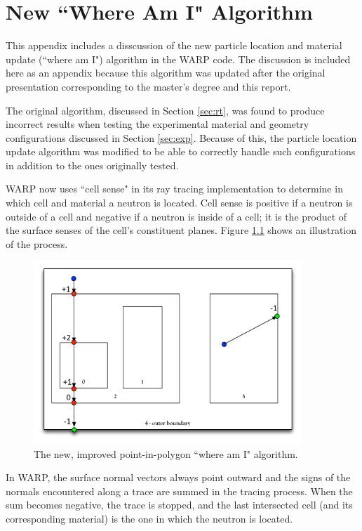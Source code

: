 \chapter{New ``Where Am I" Algorithm}
\label{app:A}

This appendix includes a disscussion of the new particle location and material update (``where am I")
algorithm in the WARP code. The discussion is included here as an appendix because this algorithm was 
updated after the original presentation corresponding to the master's degree and this report.

The original algorithm, discussed in Section \ref{sec:rt}, was found to produce incorrect results when 
testing the experimental material and geometry configurations discussed in Section \ref{sec:exp}.
Because of this, the particle location update algorithm was modified to be able to
correctly handle such configurations in addition to the ones originally tested.

WARP now uses ``cell sense" in its ray tracing implementation to determine in which cell and material a
neutron is located. Cell sense is positive if a neutron is outside of a cell and negative if a neutron is
inside of a cell; it is the product of the surface senses of the cell's constituent planes. Figure 
\ref{whereaminew} shows an illustration of the process.

\begin{figure}[h!]
\centering
\includegraphics[width=0.9\textwidth]{img/whereami-new.pdf}
\caption{The new, improved point-in-polygon ``where am I" algorithm. \label{whereaminew}}
\end{figure}

In WARP, the surface normal vectors always point outward and the signs of the normals encountered along a
trace are summed in the tracing process. When the sum becomes negative, the trace is stopped, and the 
last intersected cell (and its corresponding material) is the one in which the neutron is located.

